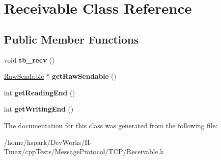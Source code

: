 \hypertarget{classReceivable}{\section{Receivable Class Reference}
\label{classReceivable}
}
\subsection*{Public Member Functions}
\begin{DoxyCompactItemize}
\item 
\hypertarget{classReceivable_a39a29183fdbf007225f4f9545856b658}{void {\bfseries tb\-\_\-recv} ()}\label{classReceivable_a39a29183fdbf007225f4f9545856b658}

\item 
\hypertarget{classReceivable_a18e6aff1e81b206d7040a220043dcbc4}{\hyperlink{structRawSendable}{Raw\-Sendable} $\ast$ {\bfseries get\-Raw\-Sendable} ()}\label{classReceivable_a18e6aff1e81b206d7040a220043dcbc4}

\item 
\hypertarget{classReceivable_aa164a5ac8424f8f10508192507992ddf}{int {\bfseries get\-Reading\-End} ()}\label{classReceivable_aa164a5ac8424f8f10508192507992ddf}

\item 
\hypertarget{classReceivable_a125e09e854697011e6ef081dcf8c2392}{int {\bfseries get\-Writing\-End} ()}\label{classReceivable_a125e09e854697011e6ef081dcf8c2392}

\end{DoxyCompactItemize}


The documentation for this class was generated from the following file\-:\begin{DoxyCompactItemize}
\item 
/home/hspark/\-Dev\-Works/\-H-\/\-Tmax/cpp\-Tests/\-Message\-Protocol/\-T\-C\-P/Receivable.\-h\end{DoxyCompactItemize}
